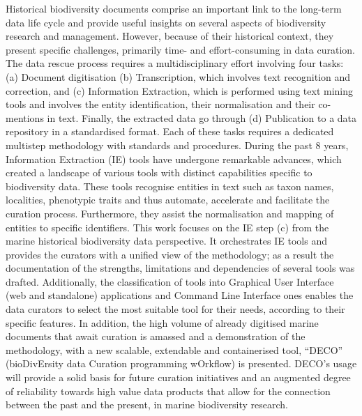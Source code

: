 Historical biodiversity documents comprise an important link to the long-term data 
life cycle and provide useful insights on several aspects of biodiversity research 
and management. However, because of their historical context, they present 
specific challenges, primarily time- and effort-consuming in data curation. 
The data rescue process requires a multidisciplinary effort involving four tasks: 
(a) Document digitisation (b) Transcription, which involves text recognition and 
correction, and (c) Information Extraction, which is performed using text mining 
tools and involves the entity identification, their normalisation and their 
co-mentions in text. Finally, the extracted data go through (d) Publication to 
a data repository in a standardised format. Each of these tasks requires a 
dedicated multistep methodology with standards and procedures. During the past 
8 years, Information Extraction (IE) tools have undergone remarkable advances, 
which created a landscape of various tools with distinct capabilities specific
to biodiversity data. These tools recognise entities in text such as taxon names, 
localities, phenotypic traits and thus automate, accelerate and facilitate 
the curation process. Furthermore, they assist the normalisation and mapping 
of entities to specific identifiers. This work focuses on the IE step (c) from 
the marine historical biodiversity data perspective. It orchestrates IE tools 
and provides the curators with a unified view of the methodology; as a result 
the documentation of the strengths, limitations and dependencies of several 
tools was drafted. Additionally, the classification of tools into Graphical 
User Interface (web and standalone) applications and Command Line Interface 
ones enables the data curators to select the most suitable tool for their needs, 
according to their specific features. In addition, the high volume of already 
digitised marine documents that await curation is amassed and a demonstration 
of the methodology, with a new scalable, extendable and containerised tool, 
“DECO” (bioDivErsity data Curation programming wOrkflow) is presented. DECO’s 
usage will provide a solid basis for future curation initiatives and an 
augmented degree of reliability towards high value data products that allow 
for the connection between the past and the present, in marine biodiversity research.

